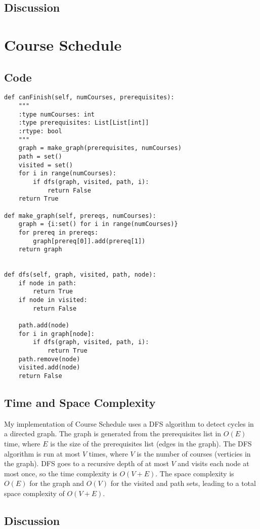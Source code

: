 \documentclass[12pt]{article}
\begin{document}
\subsection{Discussion}

\newpage

\section{Course Schedule}
\subsection{Code}
\lstset{
    caption=Course Schedule,
}
\begin{lstlisting}
def canFinish(self, numCourses, prerequisites):
    """
    :type numCourses: int
    :type prerequisites: List[List[int]]
    :rtype: bool
    """
    graph = make_graph(prerequisites, numCourses)
    path = set()
    visited = set()
    for i in range(numCourses):
        if dfs(graph, visited, path, i):
            return False
    return True

def make_graph(self, prereqs, numCourses):
    graph = {i:set() for i in range(numCourses)}
    for prereq in prereqs:
        graph[prereq[0]].add(prereq[1])
    return graph


def dfs(self, graph, visited, path, node):
    if node in path:
        return True
    if node in visited:
        return False

    path.add(node)
    for i in graph[node]:
        if dfs(graph, visited, path, i):
            return True
    path.remove(node)
    visited.add(node)
    return False
\end{lstlisting}

\subsection{Time and Space Complexity}
My implementation of Course Schedule uses a DFS algorithm to detect cycles in a directed graph.
The graph is generated from the prerequisites list in \( O(E) \) time, where \( E \) is the size
of the prerequisites list (edges in the graph). The DFS algorithm is run at most \( V \) times, where
\( V \) is the number of courses (verticies in the graph). DFS goes to a recursive depth of at most
\( V \) and visits each node at most once, so the time complexity is \( O(V + E) \). The space complexity
is \( O(E) \) for the graph and \( O(V) \) for the visited and path sets, leading to a total space complexity
of \( O(V + E) \).

\subsection{Discussion}
\end{document}
